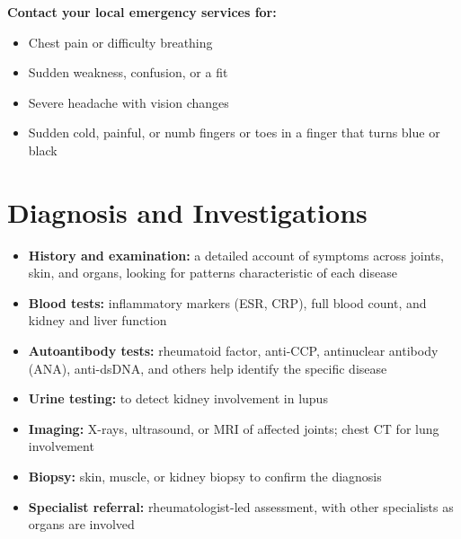 \textbf{Contact your local emergency services for:}
\begin{itemize}
    \item Chest pain or difficulty breathing
    \item Sudden weakness, confusion, or a fit
    \item Severe headache with vision changes
    \item Sudden cold, painful, or numb fingers or toes in a finger that turns blue or black
\end{itemize}

\section*{Diagnosis and Investigations}
\begin{itemize}
    \item \textbf{History and examination:} a detailed account of symptoms across joints, skin, and organs, looking for patterns characteristic of each disease
    \item \textbf{Blood tests:} inflammatory markers (ESR, CRP), full blood count, and kidney and liver function
    \item \textbf{Autoantibody tests:} rheumatoid factor, anti-CCP, antinuclear antibody (ANA), anti-dsDNA, and others help identify the specific disease
    \item \textbf{Urine testing:} to detect kidney involvement in lupus
    \item \textbf{Imaging:} X-rays, ultrasound, or MRI of affected joints; chest CT for lung involvement
    \item \textbf{Biopsy:} skin, muscle, or kidney biopsy to confirm the diagnosis
    \item \textbf{Specialist referral:} rheumatologist-led assessment, with other specialists as organs are involved
\end{itemize}

